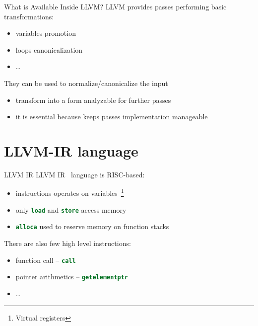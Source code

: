 \documentclass[10pt,mathserif]{beamer}
\newcommand{\llvminline}[1]{\lstinline[language=LLVM]!#1!}
\begin{document}
\begin{frame}{What is Available Inside LLVM?}
LLVM provides passes performing basic transformations:

\begin{itemize}
\item variables promotion
\item loops canonicalization
\item \ldots
\end{itemize}

\vfill
They can be used to \alert{normalize/canonicalize} the input

\begin{itemize}
\item transform into a form analyzable for further passes
\item it is essential because keeps passes implementation manageable

\end{itemize}
\end{frame}

\section{LLVM-IR language}
\begin{frame}{LLVM IR}
LLVM IR~\cite{LOCAL:www/llvmLanguageRef} language is RISC-based:

\begin{itemize}
\item instructions operates on \alert{variables}~\footnote{Virtual registers}
\item only \llvminline{load} and \llvminline{store} access memory
\item \llvminline{alloca} used to reserve memory on function stacks
\end{itemize}
\vfill
There are also few \alert{high level instructions}:
\begin{itemize}
\item function call -- \llvminline{call}
\item pointer arithmetics -- \llvminline{getelementptr}
\item \ldots
\end{itemize}
\end{frame}
\end{document}
